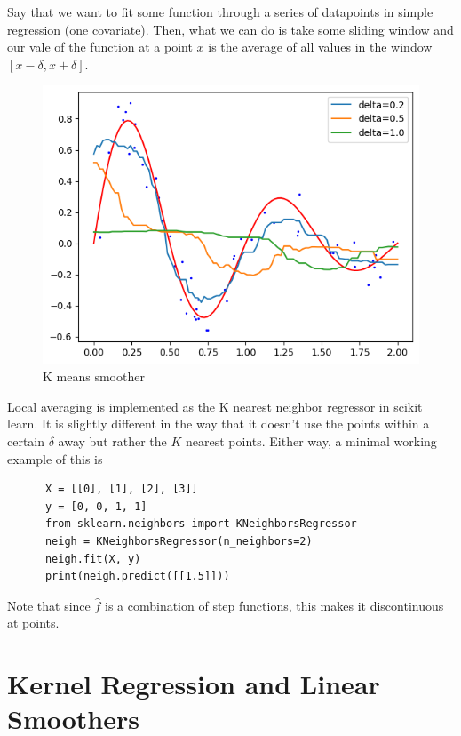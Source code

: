 \documentclass{article}
\begin{document}
  \begin{example}
    Say that we want to fit some function through a series of datapoints in simple regression (one covariate). Then, what we can do is take some sliding window and our vale of the function at a point $x$ is the average of all values in the window $[x - \delta, x + \delta]$. 
    \begin{figure}[H]
      \centering 
      \includegraphics[scale=0.6]{img/kmeans_smoother.png}
      \caption{K means smoother} 
      \label{fig:kmeans_smoother}
    \end{figure}
  \end{example}

  \begin{code}
    Local averaging is implemented as the K nearest neighbor regressor in scikit learn. It is slightly different in the way that it doesn't use the points within a certain $\delta$ away but rather the $K$ nearest points. Either way, a minimal working example of this is 
    \begin{lstlisting}
      X = [[0], [1], [2], [3]]
      y = [0, 0, 1, 1]
      from sklearn.neighbors import KNeighborsRegressor
      neigh = KNeighborsRegressor(n_neighbors=2)
      neigh.fit(X, y)
      print(neigh.predict([[1.5]])) 
    \end{lstlisting}
  \end{code}

  Note that since $\hat{f}$ is a combination of step functions, this makes it discontinuous at points. 

\section{Kernel Regression and Linear Smoothers} 
\end{document}
